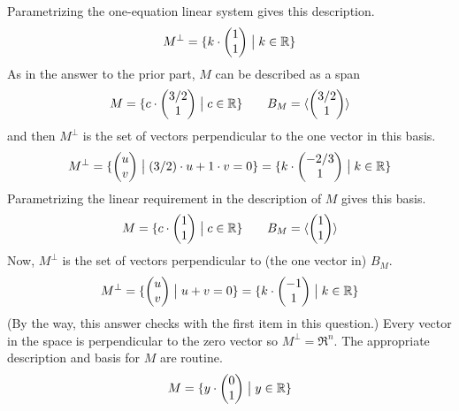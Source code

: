 \begin{exercises}
\begin{answer}
\begin{exparts}
\begin{equation*}
           \end{equation*}
           Parametrizing the one-equation linear system gives this 
           description.
           \begin{equation*}
             M^\perp=\mbox{$\{k\cdot\begin{pmatrix} 1 \\ 1 \end{pmatrix}\bigm| k\in\mathbb{R}\}$}
           \end{equation*}
         \partsitem As in the answer to the prior part, $M$ can be described as
           a span
           \begin{equation*}
             M=\mbox{$\{c\cdot\begin{pmatrix} 3/2 \\ 1 \end{pmatrix}\bigm| c\in\mathbb{R}\}$}
             \qquad
             B_M=\langle\begin{pmatrix} 3/2 \\ 1 \end{pmatrix}\rangle
           \end{equation*}
           and then $M^\perp$ is the set of vectors perpendicular to the 
           one vector in this basis.
           \begin{equation*}
             M^\perp
             =\mbox{$\{\begin{pmatrix} u \\ v \end{pmatrix}\bigm| (3/2)\cdot u+1\cdot v=0\}$}
             =\mbox{$\{k\cdot\begin{pmatrix} -2/3 \\ 1 \end{pmatrix}\bigm| k\in\mathbb{R}\}$}
           \end{equation*}
         \partsitem Parametrizing the linear requirement in the description
            of $M$ gives this basis.
            \begin{equation*}
              M=\mbox{$\{c\cdot\begin{pmatrix} 1 \\ 1 \end{pmatrix}\bigm| c\in\mathbb{R}\}$}
              \qquad
              B_M=\langle\begin{pmatrix} 1 \\ 1 \end{pmatrix}\rangle
            \end{equation*}
            Now, $M^\perp$ is the set of vectors perpendicular to (the one
            vector in) $B_M$.
            \begin{equation*}
              M^\perp
              =\mbox{$\{\begin{pmatrix} u \\ v \end{pmatrix}\bigm| u+v=0\}$}
              =\mbox{$\{k\cdot\begin{pmatrix} -1 \\ 1 \end{pmatrix}\bigm| k\in\mathbb{R}\}$}
            \end{equation*}
            (By the way, this answer checks with the first item in this 
            question.)
          \partsitem Every vector in the space is perpendicular to the zero
            vector so $M^\perp=\Re^n$.
          \partsitem The appropriate description and basis for $M$ are routine.
            \begin{equation*}
              M=\set{y\cdot\colvec{0 \\ 1}\suchthat y\in\Re}

\end{equation*}
\end{exparts}
\end{answer}
\end{exercises}
